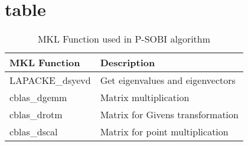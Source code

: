 \documentclass[conference]{IEEEtran}
\begin{document}
\section{table}
\begin{table}[h]
	\centering
	\caption{MKL Function used in P-SOBI algorithm}
	\begin{tabular}{ll}
		\hline
		\textbf{MKL Function}    & \textbf{Description}                      \\ \hline
		LAPACKE\_dsyevd & Get eigenvalues and eigenvectors \\
		cblas\_dgemm    & Matrix multiplication            \\ 
		cblas\_drotm    & Matrix for Givens transformation \\ 
		cblas\_dscal    & Matrix for point multiplication  \\ \hline
	\end{tabular}
\end{table}
\end{document}
